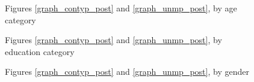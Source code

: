 \begin{figure}
    \caption{Figures \ref{graph_contyp_post} and \ref{graph_unmp_post}, by age category}
    \label{graph_post_event_age_cat}
\end{figure}

\begin{figure}
    \caption{Figures \ref{graph_contyp_post} and \ref{graph_unmp_post}, by education category}
    \label{graph_post_event_edu_cat}
\end{figure}

\begin{figure}
    \caption{Figures \ref{graph_contyp_post} and \ref{graph_unmp_post}, by gender}
    \label{graph_post_event_gender}
\end{figure}


